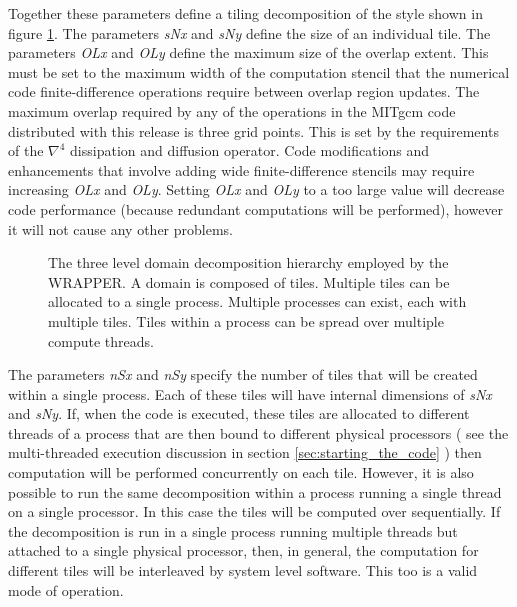 Together these parameters define a tiling decomposition of the style shown in 
figure \ref{fig:labelled_tile}. The parameters {\em sNx} and {\em sNy} define
the size of an individual tile. The parameters {\em OLx} and {\em OLy} define the
maximum size of the overlap extent. This must be set to the maximum width
of the computation stencil that the numerical code finite-difference operations
require between overlap region updates. The maximum overlap required
by any of the operations in the MITgcm code distributed with this release is three grid
points. This is set by the requirements of the $\nabla^4$ dissipation and 
diffusion operator. Code modifications and enhancements that involve adding wide 
finite-difference stencils may require increasing {\em OLx} and {\em OLy}.
Setting {\em OLx} and {\em OLy} to a too large value will decrease code
performance (because redundant computations will be performed), however it will
not cause any other problems.

\begin{figure}
\begin{center}
\end{center}
\caption{ The three level domain decomposition hierarchy employed by the
WRAPPER. A domain is composed of tiles. Multiple tiles can be allocated
to a single process. Multiple processes can exist, each with multiple tiles.
Tiles within a process can be spread over multiple compute threads.
} \label{fig:labelled_tile}
\end{figure}

 The parameters {\em nSx} and {\em nSy} specify the number of tiles that will
be created within a single process. Each of these tiles will have internal
dimensions of {\em sNx} and {\em sNy}. If, when the code is executed, these tiles are 
allocated to different threads of a process that are then bound to
different physical processors ( see the multi-threaded
execution discussion in section \ref{sec:starting_the_code} ) then
computation will be performed concurrently on each tile. However, it is also
possible to run the same decomposition within a process running a single thread on
a single processor. In this case the tiles will be computed over sequentially.
If the decomposition is run in a single process running multiple threads
but attached to a single physical processor, then, in general, the computation
for different tiles will be interleaved by system level software.
This too is a valid mode of operation.

